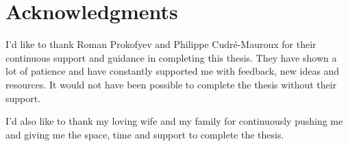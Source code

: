 \newpage
\chapter*{\centering Acknowledgments}

I'd like to thank Roman Prokofyev and Philippe Cudr\'e-Mauroux for their continuous support and guidance in completing this thesis. They have shown a lot of patience and have constantly supported me with feedback, new ideas and resources. It would not have been possible to complete the thesis without their support.

I'd also like to thank my loving wife and my family for continuously pushing me and giving me the space, time and support to complete the thesis.